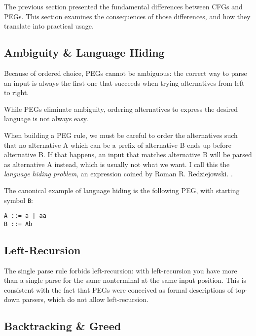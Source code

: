 The previous section presented the fundamental differences between CFGs and
PEGs. This section examines the consequences of those differences, and how they
translate into practical usage.

\subsection{Ambiguity \& Language Hiding}
\label{ambiguity}

Because of ordered choice, PEGs cannot be ambiguous: the correct way to parse an
input is always the first one that succeeds when trying alternatives from left
to right.

While PEGs eliminate ambiguity, ordering alternatives to express the desired
language is not always easy.

When building a PEG rule, we must be careful to order the alternatives such that
no alternative A which can be a prefix of alternative B ends up before
alternative B. If that happens, an input that matches alternative B will be
parsed as alternative A instead, which is usually not what we want. I call this
the \emph{language hiding problem}, an expression coined by Roman
R. Redziejowski. \cite{redziejowski2009}.

The canonical example of language hiding is the following PEG, with starting
symbol \texttt{B}:

\begin{lstlisting}
A ::= a | aa
B ::= Ab
\end{lstlisting}

\subsection{Left-Recursion}
\label{peg_left_recur}

The single parse rule forbids left-recursion: with left-recursion you have more
than a single parse for the same nonterminal at the same input position. This is
consistent with the fact that PEGs were conceived as formal descriptions of
top-down parsers, which do not allow left-recursion.

\subsection{Backtracking \& Greed}

